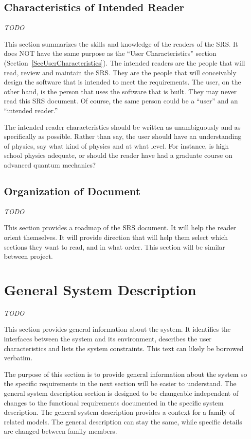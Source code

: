 \documentclass[12pt]{article}
\begin{document}
\subsection{Characteristics of Intended Reader} \label{sec_IntendedReader}

\emph{TODO}

This section summarizes the skills and knowledge of the readers of the SRS.  It
does NOT have the same purpose as the ``User Characteristics'' section
(Section~\ref{SecUserCharacteristics}).  The intended readers are the people
that will read, review and maintain the SRS.  They are the people that will
conceivably design the software that is intended to meet the requirements.  The
user, on the other hand, is the person that uses the software that is built.
They may never read this SRS document.  Of course, the same person could be a
``user'' and an ``intended reader.''

The intended reader characteristics should be written as unambiguously and as
specifically as possible.  Rather than say, the user should have an
understanding of physics, say what kind of physics and at what level.  For
instance, is high school physics adequate, or should the reader have had a
graduate course on advanced quantum mechanics?

\subsection{Organization of Document}

\emph{TODO}

This section provides a roadmap of the SRS document.  It will help the reader
orient themselves.  It will provide direction that will help them select which
sections they want to read, and in what order.  This section will be similar
between project.

\section{General System Description}

\emph{TODO}

This section provides general information about the system.  It identifies the
interfaces between the system and its environment, describes the user
characteristics and lists the system constraints.  This text can likely be
borrowed verbatim.

The purpose of this section is to provide general information about the system
so the specific requirements in the next section will be easier to understand.
The general system description section is designed to be changeable independent
of changes to the functional requirements documented in the specific system
description. The general system description provides a context for a family of
related models. The general description can stay the same, while specific
details are changed between family members.
\end{document}
